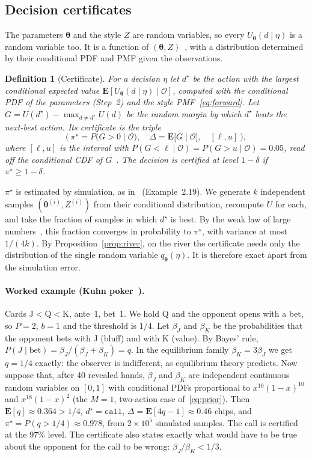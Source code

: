 \documentclass[11pt,a4paper]{article}
\newtheorem{definition}{Definition}
\newcommand{\Z}{Z}            %
\newcommand{\E}{\mathbf{E}}
\newcommand{\1}{\mathbf{1}}
\newcommand{\BT}[1]{\cite[§#1]{bertsekas2000}}
\begin{document}
\subsection{Decision certificates}
The parameters $\bm\theta$ and the style $\Z$ are random variables, so every
$U_{\bm\theta}(d\mid\eta)$ is a random variable too. It is a function of
$(\bm\theta,\Z)$~\BT{2.3}, with a distribution determined by their conditional
PDF and PMF given the observations.

\begin{definition}[Certificate]\label{def:cert}
For a decision $\eta$ let $d^\star$ be the action with the largest conditional
expected value $\E[U_{\bm\theta}(d\mid\eta)\mid\mathcal{O}]$, computed with the
conditional PDF of the parameters (Step~2) and the style PMF~\eqref{eq:forward}.
Let $G=U(d^\star)-\max_{d\neq d^\star}U(d)$ be the random margin by which
$d^\star$ beats the next-best action. Its \emph{certificate} is the triple
\[
  \Big(\ \pi^\star=P\big(G>0\mid\mathcal{O}\big),\quad
  \Delta=\E\big[G\mid\mathcal{O}\big],\quad
  [\ell,u]\ \Big),
\]
where $[\ell,u]$ is the interval with $P(G<\ell\mid\mathcal{O})=P(G>u\mid\mathcal{O})=0.05$,
read off the conditional CDF of $G$~\BT{3.2}. The decision is
\emph{certified at level $1-\delta$} if $\pi^\star\ge 1-\delta$.
\end{definition}

$\pi^\star$ is estimated by simulation, as in~\BT{2.7} (Example~2.19). We
generate $k$ independent samples $(\bm\theta^{(i)},\Z^{(i)})$ from their
conditional distribution, recompute $U$ for each, and take the fraction of
samples in which $d^\star$ is best. By the weak law of large
numbers~\BT{7.2}, this fraction converges in probability to $\pi^\star$, with
variance at most $1/(4k)$. By Proposition~\ref{prop:river}, on the river the
certificate needs only the distribution of the single random variable
$q_{\bm\theta}(\eta)$. It is therefore exact apart from the simulation error.

\paragraph{Worked example (Kuhn poker~\cite{kuhn1950}).} Cards J$<$Q$<$K, ante~1,
bet~1. We hold Q and the opponent opens with a bet, so $P=2$, $b=1$ and the
threshold is $1/4$. Let $\beta_J$ and $\beta_K$ be the probabilities that the
opponent bets with J (bluff) and with K (value). By Bayes' rule,
$P(J\mid\text{bet})=\beta_J/(\beta_J+\beta_K)=q$. In the equilibrium family
$\beta_K=3\beta_J$ we get $q=1/4$ exactly: the observer is indifferent, as
equilibrium theory predicts. Now suppose that, after 40 revealed hands,
$\beta_J$ and $\beta_K$ are independent continuous random variables on $[0,1]$
with conditional PDFs proportional to $x^{10}(1-x)^{10}$ and $x^{18}(1-x)^{2}$
(the $M=1$, two-action case of~\eqref{eq:prior}). Then $\E[q]\approx 0.364>1/4$,
$d^\star=\mathtt{call}$, $\Delta=\E[4q-1]\approx 0.46$ chips, and
$\pi^\star=P(q>1/4)\approx 0.978$, from $2\times10^5$ simulated samples. The call
is certified at the $97\%$ level. The certificate also states exactly what
would have to be true about the opponent for the call to be wrong:
$\beta_J/\beta_K<1/3$.
\end{document}
